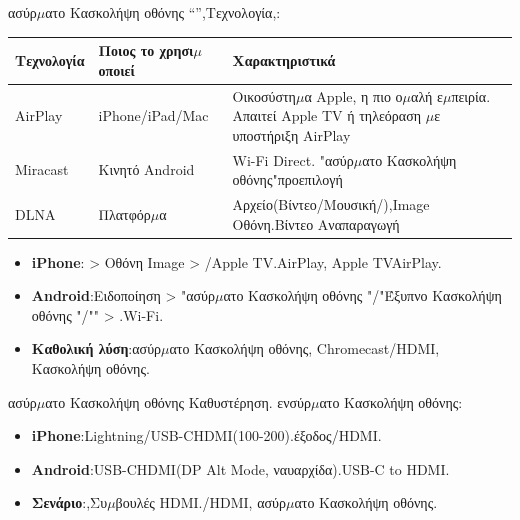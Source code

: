 


ασύρ$\mu$ατο Κασκολήψη οθόνης “”,Τεχνολογία,:

\begin{center}
\begin{tabularx}{\linewidth}{|X|X|X|}
\hline
\textbf{Τεχνολογία} & \textbf{Ποιος το χρησι$\mu$οποιεί} & \textbf{Χαρακτηριστικά} \tabularnewline
\hline
AirPlay & iPhone/iPad/Mac & Οικοσύστη$\mu$α Apple, η πιο ο$\mu$αλή ε$\mu$πειρία. Απαιτεί Apple TV ή τηλεόραση $\mu$ε υποστήριξη AirPlay \tabularnewline
Miracast & Κινητό Android & Wi-Fi Direct. "ασύρ$\mu$ατο Κασκολήψη οθόνης"προεπιλογή \tabularnewline
DLNA & Πλατφόρ$\mu$α & Αρχείο(Βίντεο/Μουσική/),Image Οθόνη.Βίντεο Αναπαραγωγή \tabularnewline
\hline
\end{tabularx}
\end{center}


\begin{itemize}
  \item \textbf{iPhone}: > Οθόνη Image > /Apple TV.AirPlay, Apple TVAirPlay.
  \item \textbf{Android}:Ειδοποίηση > "ασύρ$\mu$ατο Κασκολήψη οθόνης "/"Έξυπνο Κασκολήψη οθόνης "/"" > .Wi-Fi.
  \item \textbf{Καθολική λύση}:ασύρ$\mu$ατο Κασκολήψη οθόνης, Chromecast/HDMI, Κασκολήψη οθόνης.
\end{itemize}


ασύρ$\mu$ατο Κασκολήψη οθόνης Καθυστέρηση. ενσύρ$\mu$ατο Κασκολήψη οθόνης:

\begin{itemize}
  \item \textbf{iPhone}:Lightning/USB-CHDMI(100-200).έξοδος/HDMI.
  \item \textbf{Android}:USB-CHDMI(DP Alt Mode, ναυαρχίδα).USB-C to HDMI.
  \item \textbf{Σενάριο}:,Συ$\mu$βουλές HDMI./HDMI, ασύρ$\mu$ατο Κασκολήψη οθόνης.
\end{itemize}


